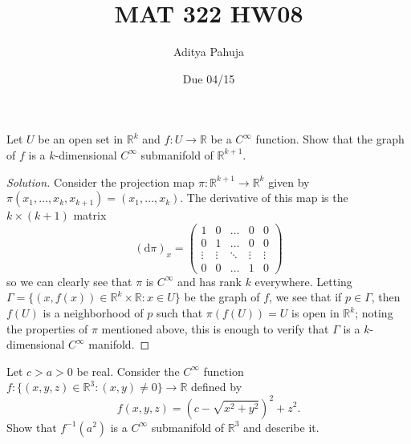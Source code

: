 \documentclass[10pt]{scrartcl}
\title{\vspace{-2em}MAT 322 HW08}
\author{\large Aditya Pahuja}
\date{\large Due 04/15}
\providecommand{\RR}{\mathbb R}
\providecommand{\inv}{^{-1}}
\newenvironment{soln}{\begin{proof}[Solution]}{\end{proof}}
\begin{document}
\maketitle

\begin{problem}
	Let $U$ be an open set in $\RR^k$ and $f\colon U\to\RR$
	be a $C^\infty$ function. Show that the graph of $f$
	is a $k$-dimensional $C^\infty$ submanifold of $\RR^{k+1}$.
\end{problem}

\begin{soln}
	Consider the projection map $\pi\colon \RR^{k+1}\to\RR^k$
	given by $\pi(x_1, \dots, x_k,x_{k+1}) = (x_1,\dots,x_k)$.
	The derivative of this map is the $k\times(k+1)$ matrix
	\[(\mathrm d\pi)_{x} = \begin{pmatrix}
		1 & 0 & \dots & 0 & 0\\
		0 & 1 & \dots & 0 & 0\\
		\vdots & \vdots & \ddots & \vdots& \vdots\\
		0&0&\dots & 1&0
	\end{pmatrix}\]
	so we can clearly see that $\pi$ is $C^\infty$ and has rank $k$ everywhere.
	Letting $\Gamma=\{(x,f(x))\in\RR^k\times\RR : x\in U\}$ be the graph of $f$,
	we see that if $p\in \Gamma$, then $f(U)$ is a neighborhood of $p$ such that
	$\pi(f(U)) = U$ is open in $\RR^k$; noting the properties of $\pi$
	mentioned above, this is enough to verify
	that $\Gamma$ is a $k$-dimensional $C^\infty$ manifold.
\end{soln}

\begin{problem}
	Let $c > a > 0$ be real. Consider the $C^\infty$ function
	$f\colon\{(x,y,z)\in\RR^3 : (x,y)\ne0\}\to\RR$ defined by
	\[f(x,y,z) = (c - \sqrt{x^2+y^2})^2 + z^2.\]
	Show that $f\inv(a^2)$ is a $C^\infty$ submanifold of $\RR^3$
	and describe it.
\end{problem}
\end{document}

